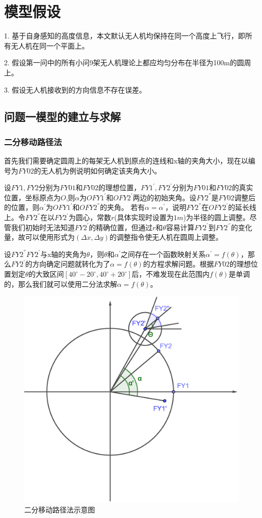 \documentclass{ctexart}
\begin{document}
\section{模型假设}
1. \quad 基于自身感知的高度信息，本文默认无人机均保持在同一个高度上飞行，即所有无人机在同一个平面上。

2. \quad 假设第一问中的所有小问9架无人机理论上都应均匀分布在半径为100m的圆周上。

3. \quad 假设无人机接收到的方向信息不存在误差。


\subsection{问题一模型的建立与求解}


  \subsubsection{二分移动路径法}

  首先我们需要确定圆周上的每架无人机到原点的连线和x轴的夹角大小，现在以编号为$FY02$的无人机为例说明如何确定该夹角大小。

  设$FY1,FY2$分别为$FY01$和$FY02$的理想位置，$FY1^{'},FY2^{'}$分别为$FY01$和$FY02$的真实位置，坐标原点为$O$,则$\alpha$为$OFY1^{'}$和$OFY2^{'}$两边的初始夹角。设$FY2^{''}$是$FY02$调整后的位置，则$\alpha^{'}$为$OFY1^{'}$和$OFY2^{''}$的夹角。
  若有$\alpha = \alpha^{'}$，说明$FY2^{''}$在$OFY2^{'}$的延长线上。令$FY2^{''}$在以$FY2^{'}$为圆心，常数$r$(具体实现时设置为$1m$)为半径的圆上调整。尽管我们初始时无法知道$FY2^{'}$的精确位置，但通过$r$和$\theta$容易计算$FY2^{'}$到$FY2^{‘'}$的变化量，故可以使用形式为$(\Delta x,\Delta y)$的调整指令使无人机在圆周上调整。
  
  设$FY2^{''}FY2^{'}$与x轴的夹角为$\theta$，则$\theta$和$\alpha^{'}$之间存在一个函数映射关系$\alpha^{'}=f(\theta)$，那么$FY2^{'}$的方向确定问题就转化为了$\alpha=f(\theta)$的方程求解问题。根据$FY02$的理想位置划定$\theta$的大致区间$[40^{\circ}-20^{\circ},40^{\circ}+20^{\circ}]$后，不难发现在此范围内$f(\theta)$是单调的，那么我们就可以使用二分法求解$\alpha=f(\theta)$。

  \begin{figure}[H]
    \centering
    \includegraphics[width=0.45\linewidth]{pic/bisection.eps}
    \caption{二分移动路径法示意图}
    \label{二分移动路径法示意图}
    \end{figure}
\end{document}
